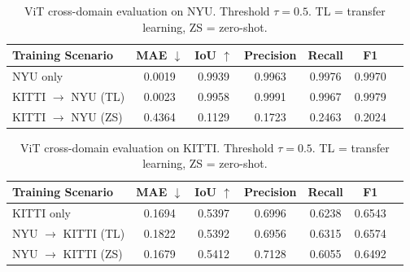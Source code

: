 \begin{table}[h]
  \centering
  \caption{ViT cross-domain evaluation on NYU. Threshold $\tau=0.5$. TL = transfer learning, ZS = zero-shot.}
  \label{tab:vit_cross_domain_nyu}
  \begin{tabular}{lcccccc}
    \toprule
    Training Scenario & MAE $\downarrow$ & IoU $\uparrow$ & Precision & Recall & F1 \\ 
    \midrule
    NYU only & 0.0019 & 0.9939 & 0.9963 & 0.9976 & 0.9970 \\
    KITTI $\rightarrow$ NYU (TL) & 0.0023 & 0.9958 & 0.9991 & 0.9967 & 0.9979 \\
    KITTI $\rightarrow$ NYU (ZS) & 0.4364 & 0.1129 & 0.1723 & 0.2463 & 0.2024 \\
    \bottomrule
  \end{tabular}
\end{table}





\begin{table}[h]
  \centering
  \caption{ViT cross-domain evaluation on KITTI. Threshold $\tau=0.5$. TL = transfer learning, ZS = zero-shot.}
  \label{tab:vit_cross_domain_kitti}
  \begin{tabular}{lcccccc}
    \toprule
    Training Scenario & MAE $\downarrow$ & IoU $\uparrow$ & Precision & Recall & F1 \\ 
    \midrule
    KITTI only & 0.1694 & 0.5397 & 0.6996 & 0.6238 & 0.6543 \\
    NYU $\rightarrow$ KITTI (TL) & 0.1822 & 0.5392 & 0.6956 & 0.6315 & 0.6574 \\
    NYU $\rightarrow$ KITTI (ZS) & 0.1679 & 0.5412 & 0.7128 & 0.6055 & 0.6492 \\
    \bottomrule
  \end{tabular}
\end{table}




